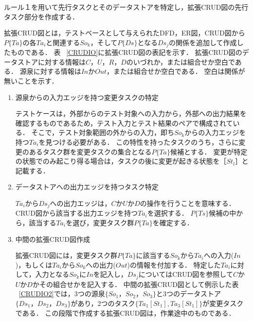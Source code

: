 ルール１を用いて先行タスクとそのデータストアを特定し，拡張CRUD図の先行タスク部分を作成する．


拡張CRUD図とは，テストベースとして与えられたDFD，ER図，CRUD図から$P\{Ta\}$の各$Ta_i$と関連する$So_k$，そして$P\{Ds\}$となる$Ds_j$の関係を追加して作成したものである．
表 ~\ref{CRUDIO}に拡張CRUD図の表記を示す．
拡張CRUD図のデータストアに対する情報は$C$，$U$，$R$，$D$のいづれか，または組合せか空白である．
源泉に対する情報は$In$か$Out$，または組合せか空白である．
空白は関係が無いことを示す．

\begin{enumerate}
\item 源泉からの入力エッジを持つ変更タスクの特定

テストケースは，外部からのテスト対象への入力から，外部への出力結果を確認するものであるため，テスト入力とテスト結果のペアで構成されている．
そこで，テスト対象範囲の外からの入力，即ち$So_k$からの入力エッジを持つ$Ta_i$を見つける必要がある．
この特性を持ったタスクのうち，さらに変更のあるタスク群を変更タスクの集合となる$P\{Ta\}$候補とする．
変更が特定の状態でのみ起こり得る場合は，タスクの後に変更が起きる状態を［$St_l$］と記載する．

\item データストアへの出力エッジを持つタスク特定

$Ta_i$から$Ds_j$への出力エッジは，$C$か$U$か$D$の操作を行うことを意味する．CRUD図から該当する出力エッジを持つ$Ta_i$を選択する．
$P\{Ts\}$候補の中から，該当する$Ta_i$を選び，変更タスク群$P\{Ta\}$を確定する．

\item 中間の拡張CRUD図作成

拡張CRUD図には，変更タスク群$P\{Ta\}$に該当する$So_k$から$Ta_i$への入力($In$)，もしくは$Ta_i$から$So_k$への出力($Out$)の情報を付加する．
特定した$Ta_i$に対して，入力となる$So_k$に$In$を記入し，$Ds_j$についてはCRUD図を参照して$C$か$U$か$D$かその組合せかを記入する．
中間の拡張CRUD図として例示した表 ~\ref{CRUDIO2}では，3つの源泉$\{So_1，So_2，So_3\}$と3つのデータストア$\{Ds_1，Ds_2，Ds_3\}$があり，2つのタスク$\{Ta_1[St_1],Ta_3[St_1]\}$が変更タスクである．
この段階で作成する拡張CRUD図は，作業途中のものである．

\end{enumerate}


